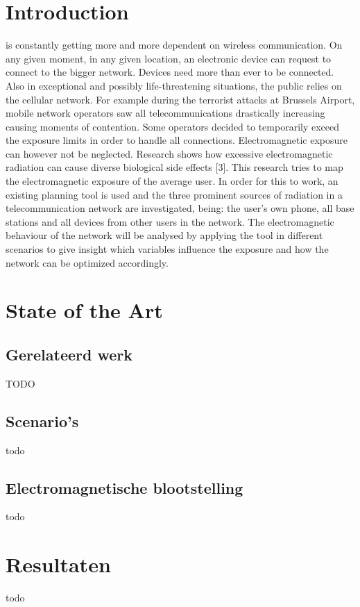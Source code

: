 \documentclass[twocolumn]{phdsymp} %
\begin{document}
\section{Introduction}
 is constantly getting more and more dependent on wireless communication. On any
given moment, in any given location, an electronic device can request to connect to the bigger
network. Devices need more than ever to be connected. Also in exceptional and possibly life-threatening situations, the public relies on the cellular
network. For example during the terrorist attacks at Brussels Airport, mobile network operators
saw all telecommunications drastically increasing causing moments of contention. Some
operators decided to temporarily exceed the exposure limits in order to handle all connections.
Electromagnetic exposure can however not be neglected. Research shows how excessive electromagnetic
radiation can cause diverse biological side effects [3].
This research tries to map  the electromagnetic exposure of the average user. In order 
for this to work, an existing planning tool is used and the
three prominent sources of radiation in a telecommunication network are investigated, being: the user’s own
phone, all base stations and all devices from other users in the network.
The electromagnetic behaviour of the network will be analysed by applying the tool in different
scenarios to give insight which variables influence the exposure and how the network can be
optimized accordingly.



\section{State of the Art}

\subsection{Gerelateerd werk}
TODO

\subsection{Scenario's}
todo 

\subsection{Electromagnetische blootstelling}
todo

\section{Resultaten}
todo
\end{document}
